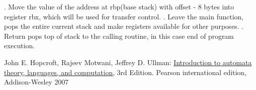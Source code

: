 \documentclass{article}
\theoremstyle{theorem}
\theoremstyle{definition}
\theoremstyle{remark}
\begin{document}
\newline {}. Move the value of the address at rbp(base stack) with offset - 8 bytes into register rbx, which will be used for transfer control.
\newline {}. Leave the main function, pops the entire current stack and make registers available for other purposes.
\newline {}. Return pops top of stack to the calling routine, in this case end of program execution.
\begin{thebibliography}{99}
	John E. Hopcroft, Rajeev Motwani, Jeffrey D. Ullman:
\href{http://ce.sharif.edu/courses/94-95/1/ce414-2/resources/root/Text%20Books/Automata/John%20E.%20Hopcroft,%20Rajeev%20Motwani,%20Jeffrey%20D.%20Ullman-Introduction%20to%20Automata%20Theory,%20Languages,%20and%20Computations-Prentice%20Hall%20(2006).pdf}{Introduction to automata theory, languages, and computation,} 3rd Edition. Pearson international edition, Addison-Wesley 2007

\end{thebibliography}
\end{document}
